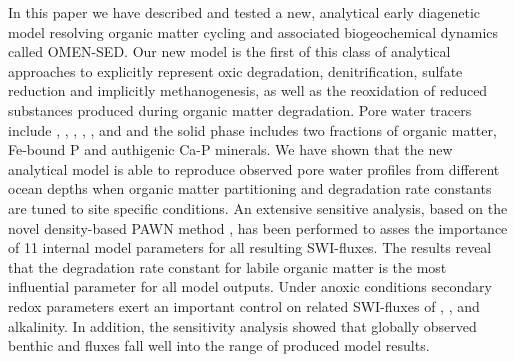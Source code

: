 \documentclass[gmd, manuscript]{copernicus}
\begin{document}



\conclusions  %
In this paper we have described and tested a new, analytical early diagenetic model resolving organic matter cycling and associated biogeochemical dynamics called OMEN-SED. 
Our new model is the first of this class of analytical approaches to explicitly represent oxic degradation, denitrification, sulfate reduction and implicitly methanogenesis, 
as well as the reoxidation of reduced substances produced during organic matter degradation. Pore water tracers include , , , , ,  and  and the solid phase includes 
two fractions of organic matter, Fe-bound P and authigenic Ca-P minerals. 
We have shown that the new analytical model is able to reproduce observed pore water profiles from different ocean depths when organic matter partitioning and degradation rate constants are tuned to site specific conditions. An extensive sensitive analysis, 
based on the novel density-based PAWN method \citep{pianosi_simple_2015}, has been performed to asses the importance of 11 internal model parameters for all resulting SWI-fluxes. The results reveal that the degradation rate constant for labile organic 
matter is the most influential parameter for all model outputs. Under anoxic conditions secondary redox parameters exert an important control on related SWI-fluxes of , ,  and alkalinity. 
In addition, the sensitivity analysis showed that globally observed benthic  and  fluxes fall well into the range of produced model results. 
\end{document}
